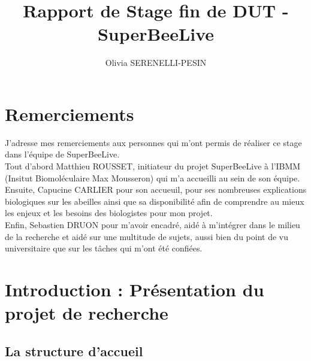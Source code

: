\documentclass[11pt,french,a4paper]{report}
\title{Rapport de Stage fin de DUT - SuperBeeLive}
\author{Olivia SERENELLI-PESIN}
\begin{document}
\maketitle

\clearpage
\newpage 

\chapter*{Remerciements}

J’adresse mes remerciements aux personnes qui m’ont permis de réaliser ce stage dans l’équipe de SuperBeeLive. \\
Tout d’abord Matthieu ROUSSET, initiateur du projet SuperBeeLive à l'IBMM (Insitut Biomoléculaire Max Mousseron) 
qui m’a accueilli au sein de son équipe. \\
Ensuite, Capucine CARLIER pour son accueuil, pour ses nombreuses explications biologiques sur les abeilles ainsi que sa disponibilité 
afin de comprendre au mieux les enjeux et les besoins des biologistes pour mon projet. \\
Enfin, Sebastien DRUON pour m’avoir encadré, aidé à m’intégrer dans le milieu de la recherche et aidé sur une multitude 
de sujets, aussi bien du point de vu universitaire que sur les tâches qui m’ont été confiées. \\

\tableofcontents

\clearpage

\chapter{Introduction : Présentation du projet de recherche}
\section{La structure d'accueil} 
\end{document}
